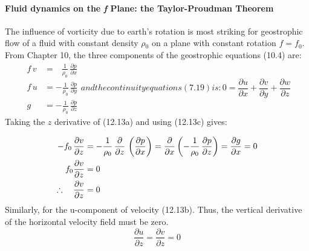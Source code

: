 \paragraph{Fluid dynamics on the \textbf{\textit{f}} Plane: the Taylor-Proudman
Theorem} The influence of vorticity due to
earth's rotation is most striking for geostrophic flow of a fluid with constant density
$\rho{_0}$ on a plane with constant rotation $f = f_0$. From Chapter 10, the three components
of the geostrophic equations (10.4) are:
\begin{subequations}
\begin{align}
f\,v &= \;\;\, \frac{1}{\rho_{0}}\,\frac{\partial{p}}{\partial{x}} \\
f\,u  &= -\frac{1}{\rho_{0}}\,\frac{\partial{p}}{\partial{y}} \\
g     &= -\frac{1}{\rho_{0}}\,\frac{\partial{p}}{\partial{z}}
\end{align}
and the continuity equations (7.19) is:
\begin{equation}
0 = \frac{\partial{u}}{\partial{x}} + \frac{\partial{v}}{\partial{y}} +
\frac{\partial{w}}{\partial{z}}
\end{equation}
\end{subequations}
Taking the $z$ derivative of (12.13a) and using (12.13c) gives:

\begin{align}
-f_0\,\frac{\partial{v}}{\partial{z}} &= -\frac{1}{\rho_{0}}\,\frac{\partial
}{\partial{z}}\,
\left(\frac{\partial{p}}{\partial{x}}\right) = \frac{\partial
}{\partial{x}}\left(-\frac{1}{\rho_{0}}\,\frac{\partial{p}}{\partial{z}}\right) =
\frac{\partial g}{\partial x}= 0
\notag \\
 f_{0} \frac{\partial{v}}{\partial{z}} &= 0 \notag \\
\therefore \quad \frac{\partial{v}}{\partial{z}} &= 0 \notag
\end{align}
Similarly, for the u-component of velocity (12.13b). Thus, the vertical derivative
of the horizontal velocity field must be zero.
\begin{equation}
\boxed{ \frac{\partial{u}}{\partial{z}} = \frac{\partial{v}}{\partial{z}} =0  }
\end{equation}


